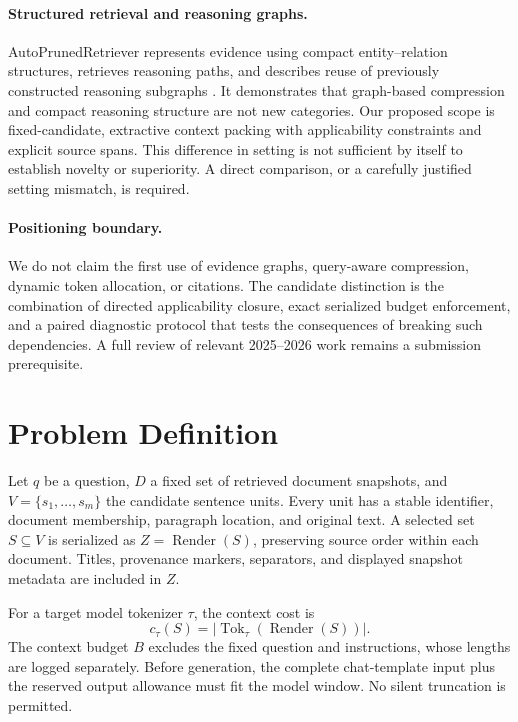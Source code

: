\documentclass[10pt,twocolumn]{article}
\newcommand{\Tok}{\operatorname{Tok}}
\newcommand{\Render}{\operatorname{Render}}
\begin{document}
\paragraph{Structured retrieval and reasoning graphs.}
AutoPrunedRetriever represents evidence using compact entity--relation structures, retrieves reasoning paths, and describes reuse of previously constructed reasoning subgraphs \cite{apr}. It demonstrates that graph-based compression and compact reasoning structure are not new categories. Our proposed scope is fixed-candidate, extractive context packing with applicability constraints and explicit source spans. This difference in setting is not sufficient by itself to establish novelty or superiority. A direct comparison, or a carefully justified setting mismatch, is required.

\paragraph{Positioning boundary.}
We do not claim the first use of evidence graphs, query-aware compression, dynamic token allocation, or citations. The candidate distinction is the combination of directed applicability closure, exact serialized budget enforcement, and a paired diagnostic protocol that tests the consequences of breaking such dependencies. A full review of relevant 2025--2026 work remains a submission prerequisite.

\section{Problem Definition}
Let $q$ be a question, $D$ a fixed set of retrieved document snapshots, and $V=\{s_1,\ldots,s_m\}$ the candidate sentence units. Every unit has a stable identifier, document membership, paragraph location, and original text. A selected set $S\subseteq V$ is serialized as $Z=\Render(S)$, preserving source order within each document. Titles, provenance markers, separators, and displayed snapshot metadata are included in $Z$.

For a target model tokenizer $\tau$, the context cost is
\begin{equation}
 c_\tau(S)=|\Tok_\tau(\Render(S))|.
\end{equation}
The context budget $B$ excludes the fixed question and instructions, whose lengths are logged separately. Before generation, the complete chat-template input plus the reserved output allowance must fit the model window. No silent truncation is permitted.
\end{document}
